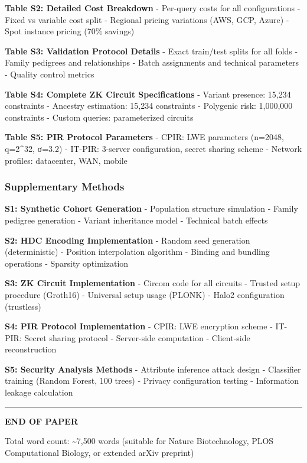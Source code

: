\documentclass[
  11pt,
]{article}
\begin{document}
\textbf{Table S2: Detailed Cost Breakdown} - Per-query costs for all
configurations - Fixed vs variable cost split - Regional pricing
variations (AWS, GCP, Azure) - Spot instance pricing (70\% savings)

\textbf{Table S3: Validation Protocol Details} - Exact train/test splits
for all folds - Family pedigrees and relationships - Batch assignments
and technical parameters - Quality control metrics

\textbf{Table S4: Complete ZK Circuit Specifications} - Variant
presence: 15,234 constraints - Ancestry estimation: 15,234 constraints -
Polygenic risk: 1,000,000 constraints - Custom queries: parameterized
circuits

\textbf{Table S5: PIR Protocol Parameters} - CPIR: LWE parameters
(n=2048, q=2\^{}32, σ=3.2) - IT-PIR: 3-server configuration, secret
sharing scheme - Network profiles: datacenter, WAN, mobile

\subsubsection{Supplementary Methods}\label{supplementary-methods}

\textbf{S1: Synthetic Cohort Generation} - Population structure
simulation - Family pedigree generation - Variant inheritance model -
Technical batch effects

\textbf{S2: HDC Encoding Implementation} - Random seed generation
(deterministic) - Position interpolation algorithm - Binding and
bundling operations - Sparsity optimization

\textbf{S3: ZK Circuit Implementation} - Circom code for all circuits -
Trusted setup procedure (Groth16) - Universal setup usage (PLONK) -
Halo2 configuration (trustless)

\textbf{S4: PIR Protocol Implementation} - CPIR: LWE encryption scheme -
IT-PIR: Secret sharing protocol - Server-side computation - Client-side
reconstruction

\textbf{S5: Security Analysis Methods} - Attribute inference attack
design - Classifier training (Random Forest, 100 trees) - Privacy
configuration testing - Information leakage calculation

\begin{center}\rule{0.5\linewidth}{0.5pt}\end{center}

\textbf{END OF PAPER}

Total word count: \textasciitilde7,500 words (suitable for Nature
Biotechnology, PLOS Computational Biology, or extended arXiv preprint)
\end{document}
